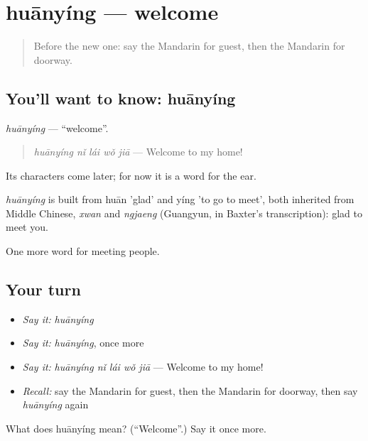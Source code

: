 \section[huānyíng]{huānyíng — welcome}

\label{lesson:ZH-C74-huanying}



\begin{quote}
Before the new one: say the Mandarin for guest, then the Mandarin for doorway.
\end{quote}

\subsection*{You'll want to know: huānyíng}
\emph{huānyíng} — \textquotedblleft{}welcome\textquotedblright{}.

\begin{quote}
\emph{huānyíng nǐ lái wǒ jiā} — Welcome to my home!
\end{quote}

Its characters come later; for now it is a word for the ear.

\begin{cousinweb}
\emph{huānyíng} is built from huān 'glad' and yíng 'to go to meet', both inherited from Middle Chinese, \emph{xwan} and \emph{ngjaeng} (Guangyun, in Baxter's transcription): glad to meet you.
\end{cousinweb}

\begin{grammarlens}[title={What you've built}]
One more word for meeting people.
\end{grammarlens}

\subsection*{Your turn}
\begin{itemize}
\raggedright
  \item \emph{Say it:} \emph{huānyíng}
  \item \emph{Say it:} \emph{huānyíng}, once more
  \item \emph{Say it:} \emph{huānyíng nǐ lái wǒ jiā} — Welcome to my home!
  \item \emph{Recall:} say the Mandarin for guest, then the Mandarin for doorway, then say \emph{huānyíng} again
\end{itemize}

\begin{tcolorbox}[breakable,colback=teal!4,colframe=teal!35!black,title={Before you move on}]
What does huānyíng mean? (\textquotedblleft{}Welcome\textquotedblright{}.) Say it once more.
\end{tcolorbox}
